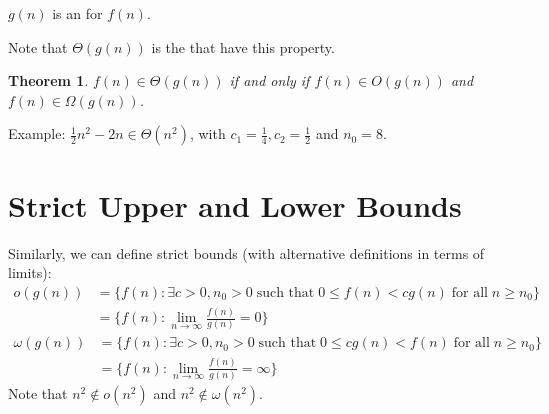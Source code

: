 \documentclass[a4paper]{report}
\newtheorem{theo}{Theorem}
\newcommand{\LHS}[1]{\hspace{1.5em}\mathllap{#1}}
\newcommand{\LHSS}[2]{\hspace{#1}\mathllap{#2}}
\newcommand{\bookref}[3]{\marginpar{\faBook{}~#1\\Chapter #2\\Section #3}}
\theoremstyle{definition}
\begin{document}
$g(n)$ is an  for $f(n)$.

Note that $\Theta(g(n))$ is the  that have this property.

\begin{theo}
$f(n) \in \Theta(g(n))$ if and only if $f(n) \in O(g(n))$ and $f(n) \in \Omega(g(n))$.
\end{theo}

Example: $\frac{1}{2}n^2 - 2n \in \Theta(n^2)$, with $c_1 = \frac{1}{4}, c_2 = \frac{1}{2}$ and $n_0 = 8$.
\begin{center}
\end{center}


\section{Strict Upper and Lower Bounds}
\bookref{CLRS}{3}{3.1}
Similarly, we can define strict bounds (with alternative definitions in terms of limits):
%
\begin{align*}
o(g(n)) &= \{ f(n) : \exists c > 0, n_0 > 0 \;\text{such that}\; 0 \leq f(n) < cg(n) \;\text{for all}\; n \geq n_0\}\\
        &= \{ f(n) : \lim_{n\to \infty}\frac{f(n)}{g(n)} = 0 \}
\end{align*}
%
\begin{align*}
\omega(g(n)) &= \{ f(n) : \exists c > 0, n_0 > 0 \;\text{such that}\; 0 \leq cg(n) < f(n) \;\text{for all}\; n \geq n_0\}\\
             &= \{ f(n) : \lim_{n\to \infty}\frac{f(n)}{g(n)} = \infty \}
\end{align*}
%
Note that $n^2 \not\in o(n^2)$ and $n^2 \not\in \omega(n^2)$.
\end{document}
